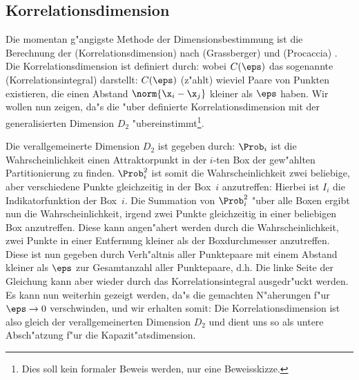 \subsection{Korrelationsdimension}
\label{chapcorrdim}


Die momentan g"angigste Methode der Dimensionsbestimmung ist die Berechnung der
\begriff(Korrelationsdimension) nach \autor(Grassberger) und \autor(Procaccia)
\cite{Grassberger-procaccia}. Die Korrelationsdimension ist definiert durch:
wobei $C(\eps)$ das sogenannte \begriff(Korrelationsintegral) darstellt: 
$C(\eps)$ \naja(z"ahlt) wieviel Paare von Punkten existieren, die einen Abstand
$\norm{\x_i-\x_j}$ kleiner als $\eps$ haben. Wir wollen nun zeigen, da"s die "uber
 definierte Korrelationsdimension mit der generalisierten Dimension $D_2$ 
"ubereinstimmt\footnote{Dies soll kein formaler Beweis werden, nur eine Beweisskizze.}.

Die verallgemeinerte Dimension $D_2$ ist gegeben durch:
$\Prob_i$ ist die Wahrscheinlichkeit einen Attraktorpunkt in der $i$-ten Box der
gew"ahlten Partitionierung zu finden. $\Prob_i^2$ ist somit die Wahrscheinlichkeit zwei
beliebige, aber verschiedene Punkte gleichzeitig in der Box~$i$ anzutreffen:
Hierbei ist $I_i$ die Indikatorfunktion der Box~$i$.  Die Summation von $\Prob_i^2$ "uber
alle Boxen ergibt nun die Wahrscheinlichkeit, irgend zwei Punkte gleichzeitig in einer
beliebigen Box anzutreffen.  Diese kann angen"ahert werden durch die Wahrscheinlichkeit,
zwei Punkte in einer Entfernung kleiner als der Boxdurchmesser anzutreffen.
Diese ist nun gegeben durch Verh"altnis aller Punktepaare mit einem
Abstand kleiner als $\eps$ zur Gesamtanzahl aller Punktepaare, d.h.
Die linke Seite der Gleichung kann aber wieder durch das Korrelationsintegral
 ausgedr"uckt werden. Es kann nun weiterhin gezeigt werden, da"s die
gemachten N"aherungen f"ur $\eps\to0$ verschwinden, und wir erhalten somit:
Die Korrelationsdimension ist also gleich der verallgemeinerten Dimension $D_2$ und dient
uns so als untere Absch"atzung f"ur die  Kapazit"atsdimension. 

